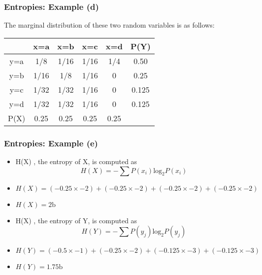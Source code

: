 ﻿\documentclass[a4]{beamer}
\begin{document}
\begin{frame}
\frametitle{Entropies: Example (d)}
The marginal distribution of these two random variables is as follows:\\ \bigskip
\begin{center}
\begin{tabular}{|c|c|c|c|c||c|}
\hline
&x=a& x=b & x=c & x=d &\alert{P(Y)}\\ \hline
y=a &1/8 &1/16 &1/16 &1/4 & \alert{0.50}\\ \hline
y=b &1/16 & 1/8& 1/16& 0 & \alert{0.25}\\ \hline
y=c & 1/32&1/32 & 1/16 & 0& \alert{0.125}\\ \hline
y=d & 1/32& 1/32& 1/16 & 0& \alert{0.125}\\ \hline \hline
\alert{P(X)} & \alert{0.25}& \alert{0.25}& \alert{0.25} & \alert{0.25}&\\ \hline
\end{tabular}
\end{center}
\end{frame}


\begin{frame}
\frametitle{Entropies: Example (e)}
\begin{itemize}

\item H(X) , the entropy of X, is computed as\\
 \[H(X) = -\sum P(x_i) \mbox{log}_2P(x_i)\] \item $H(X) =  (-0.25 \times -2) + (-0.25 \times -2) +(-0.25 \times -2) +(-0.25 \times -2)$\item $ H(X) = 2 \mbox{b}$ \bigskip

\item H(X) , the entropy of Y, is computed as\\
 \[H(Y) = -\sum P(y_j) \mbox{log}_2P(y_j)\] \item $H(Y) =  (-0.5 \times -1) +(-0.25 \times -2)  + (-0.125 \times -3)  +(-0.125 \times -3)$\item $ H(Y) = 1.75 \mbox{b}$



\end{itemize}
\end{frame}
\end{document}
